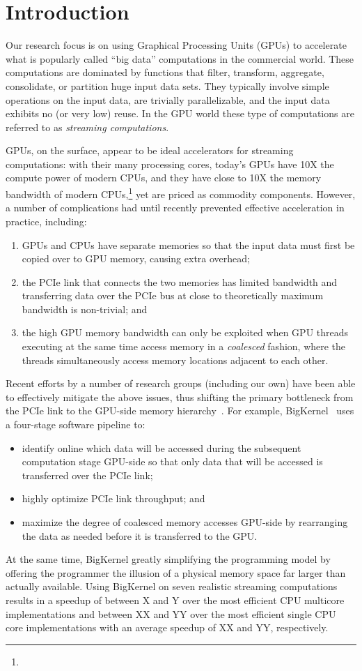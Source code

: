 \section{Introduction}
Our research focus is on using Graphical Processing Units (GPUs) to accelerate what is popularly called ``big data'' computations in the commercial world.
These computations are dominated by functions that filter, transform, aggregate, consolidate, or partition huge input data sets.
They typically involve simple operations on the input data, are trivially parallelizable, and the input data exhibits no (or very low) reuse.
In the GPU world these type of computations are referred to as \emph{streaming computations}.

GPUs, on the surface, appear to be ideal accelerators for streaming computations: with their many processing cores, today's GPUs have 10X the compute power of modern CPUs, and they have close to 10X the memory bandwidth of modern CPUs,\footnote{
	}
yet are priced as commodity components.
However, a number of complications had until recently prevented effective acceleration in practice, including:
\begin{enumerate}
\item  GPUs and CPUs have separate memories so that the input data must first be copied over to GPU memory, causing extra overhead;
\item the PCIe link that connects the two memories has limited bandwidth and transferring data over the PCIe bus at close to theoretically maximum bandwidth is non-trivial; and
\item the high GPU memory bandwidth can only be exploited when GPU threads executing at the same time access memory in a \emph{coalesced} fashion, where the threads simultaneously access memory locations adjacent to each other.
\end{enumerate}
Recent efforts by a number of research groups (including our own) have been able to effectively mitigate the above issues, thus shifting the primary bottleneck from the PCIe link to the GPU-side memory hierarchy~\cite{???,???,???}. 
For example, BigKernel~\cite{???}  uses a four-stage software pipeline to:
\begin{itemize}
\item identify online which data will be accessed during the subsequent computation stage GPU-side so that only data that will be accessed is transferred over the PCIe link;
\item highly optimize PCIe link throughput; and
\item maximize the degree of coalesced memory accesses GPU-side by rearranging the data as needed before it is transferred to the GPU. 
\end{itemize}
At the same time, BigKernel greatly simplifying the programming model by offering the programmer the illusion of a physical memory space far larger than actually available.
Using BigKernel on seven realistic streaming computations results in a speedup of between X and Y over the most efficient CPU multicore implementations and between XX and YY over the most efficient single CPU core implementations with an average speedup of XX and YY, respectively.

